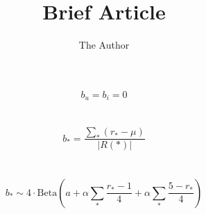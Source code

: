 \documentclass[11pt]{amsart}
\title{Brief Article}
\author{The Author}
\begin{document}
\maketitle
$$b_u = b_i = 0 $$
\\
\\

$$b_* = \frac{\sum_*(r_* - \mu)}{|R(*)|}$$
\\
\\

$$b_* \sim 4 \cdot \textrm{Beta} \left( a + \alpha \sum_* \frac{r_{*}-1}{4}  + \alpha \sum_* \frac{5 - r_{*}}{4} \right)$$
\end{document}
